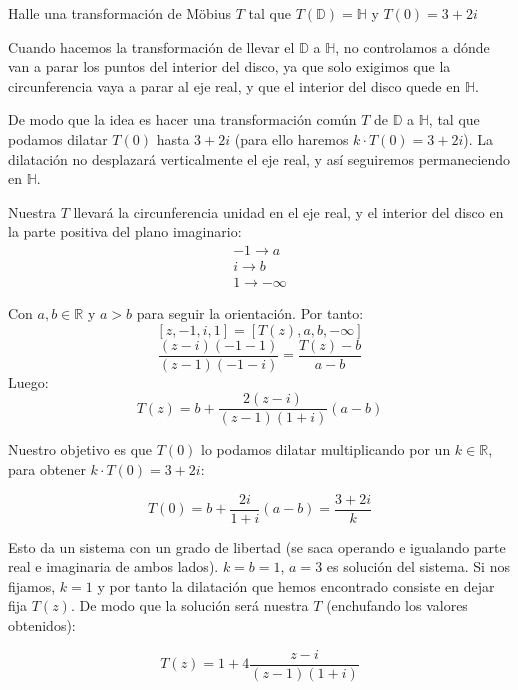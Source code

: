 \begin{problem}[9]
Halle una transformación de Möbius $T$ tal que $T(\mathbb{D}) = \mathbb{H}$ y $T(0) = 3 + 2i$
\solution
{}

Cuando hacemos la transformación de llevar el $\mathbb{D}$ a $\mathbb{H}$, no controlamos a dónde van a parar los puntos del interior del disco, ya que solo exigimos que la circunferencia vaya a parar al eje real, y que el interior del disco quede en $\mathbb{H}$.

De modo que la idea es hacer una transformación común $T$ de $\mathbb{D}$ a $\mathbb{H}$, tal que podamos dilatar $T(0)$ hasta $3+2i$ (para ello haremos $k·T(0) = 3+2i$). La dilatación no desplazará verticalmente el eje real, y así seguiremos permaneciendo en $\mathbb{H}$.

Nuestra $T$ llevará la circunferencia unidad en el eje real, y el interior del disco en la parte positiva del plano imaginario:
\begin{align*}
	-1 \to a\\
	i \to b\\
	1 \to -∞
\end{align*}

Con $a,b ∈ ℝ$ y $a>b$ para seguir la orientación. Por tanto:
\[ [z,-1,i,1] = [T(z),a,b,-∞] \]
\[\frac{(z-i)(-1-1)}{(z-1)(-1-i)} = \frac{T(z) - b}{a-b}\]
Luego:
\[T(z) = b + \frac{2(z-i)}{(z-1)(1+i)}(a-b)\]

Nuestro objetivo es que $T(0)$ lo podamos dilatar multiplicando por un $k ∈ ℝ$, para obtener $k·T(0) = 3+2i$:

\[T(0) = b + \frac{2i}{1+i}(a-b) = \frac{3+2i}{k}\]

Esto da un sistema con un grado de libertad (se saca operando e igualando parte real e imaginaria de ambos lados). $k=b=1$, $a=3$ es solución del sistema. Si nos fijamos, $k=1$ y por tanto la dilatación que hemos encontrado consiste en dejar fija $T(z)$. De modo que la solución será nuestra $T$ (enchufando los valores obtenidos):

\[T(z) = 1 + 4 \frac{z-i}{(z-1)(1+i)}\]


\end{problem}

